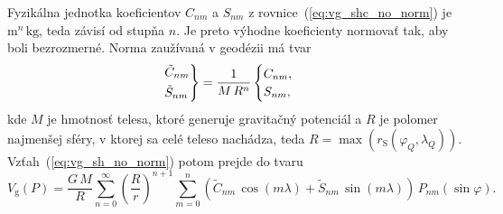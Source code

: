\documentclass[a4paper, 12pt]{book}
\newcommand{\gidx}{\mathrm g}
\begin{document}
Fyzikálna jednotka koeficientov $C_{nm}$ a $S_{nm}$ 
z rovnice~(\ref{eq:vg_shc_no_norm}) je $\mathrm{m}^n \, \mathrm{kg}$, teda 
závisí od stupňa $n$.  Je preto výhodne koeficienty normovať tak, aby boli 
bezrozmerné.  Norma zaužívaná v geodézii má tvar
%
\begin{equation}
\begin{rcases}
\tilde{C}_{nm}\\
\tilde{S}_{nm}
\end{rcases}
= \frac{1}{M \, R^n}
\begin{cases}
C_{nm}{,}\\
S_{nm}{,}
\end{cases}
\end{equation}
%
kde $M$ je hmotnosť telesa, ktoré generuje gravitačný potenciál a $R$ je 
polomer najmenšej sféry, v ktorej sa celé teleso nachádza, teda $R 
= \max(r_\mathrm{S}(\varphi_Q, \lambda_Q))$.  Vzťah~(\ref{eq:vg_sh_no_norm}) 
potom prejde do tvaru
%
\begin{equation}
\label{eq:vg_sh_1st_norm}
V_\gidx(P) = \frac{G \, M}{R} \sum_{n = 0}^\infty \left( \frac{R}{r} \right)^{n 
+ 1} \sum_{m = 0}^{n} \left( \tilde{C}_{nm} \, \cos(m\lambda) + \tilde{S}_{nm} 
\, \sin(m\lambda)\right) \, P_{nm}(\sin\varphi){.}
\end{equation}
\end{document}
